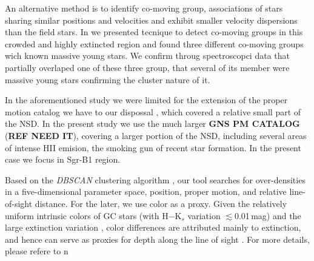 \documentclass{aa} %
\begin{document}
	An alternative method is to identify co-moving group, associations of stars sharing similar positions and velocities and exhibit smaller velocity dispersions than the field stars.  In  \citep{comuving_yo} we presented tecnique to detect co-moving groups in this crowded and highly extincted region and found three different co-moving groups wich known massive young stars. We confirm throug spectroscopci data that partially overlaped one of these three group, that several of its member were massive young stars \citep{Candela} confirming the cluster nature of it. 
	
	In the aforementioned study we were limited for the extension  of the proper motion catalog we have to our dispossal \cite{LIBRALA2021}, which covered a relative small part of the NSD. In the present study we use the much larger \textbf{GNS PM CATALOG} (\textbf{REF NEED IT}), covering a larger portion of the NSD, including several areas of intense HII emision, the smoking gun of recent star formation. In the present case we focus in Sgr-B1 region. 
	
	
	Based on the \textit{DBSCAN} clustering algorithm \citep{dbscan}, our tool searches for over-densities in a five-dimensional parameter space, position, proper motion, and relative line-of-sight distance. For the later, we use color as a proxy. Given the relatively uniform intrinsic colors of GC stars (with H$-$K$_s$ variation $\lesssim$0.01\,mag) and the large extinction variation \citep{GNSI, GNSIV, Ban_catalog, paco_NSD}, color differences are attributed mainly to extinction, and hence can serve as proxies for depth along the line of sight \citep{paco_NSD}. For more details, please refere to n \citep{comuving_yo}
	
	


	

	
	
\end{document}
